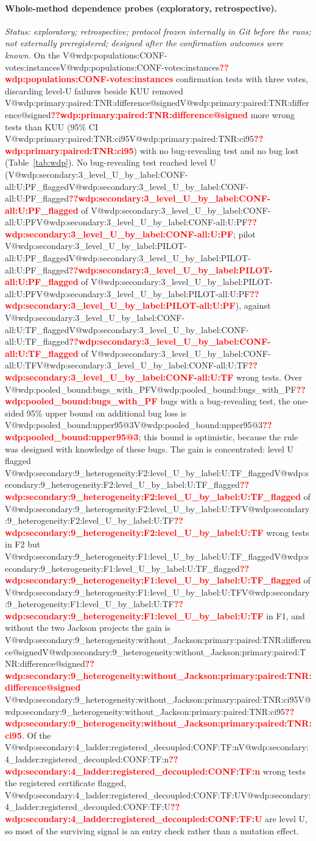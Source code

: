 \documentclass[journal]{IEEEtran}
\makeatletter
\newcommand{\V}[1]{\ifcsname V@#1\endcsname\csname V@#1\endcsname\else\textbf{\textcolor{red}{??#1}}\fi}
\makeatother
\begin{document}
\paragraph{Whole-method dependence probes (exploratory, retrospective).} \emph{Status: exploratory; retrospective; protocol frozen internally in Git before the runs; not externally preregistered; designed after the confirmation outcomes were known.} On the \V{wdp:populations:CONF-votes:instances} confirmation tests with three votes, discarding level-U failures beside KUU removed \V{wdp:primary:paired:TNR:difference@signed} more wrong tests than KUU (95\% CI \V{wdp:primary:paired:TNR:ci95}) with no bug-revealing test and no bug lost (Table~\ref{tab:wdp}). No bug-revealing test reached level U (\V{wdp:secondary:3_level_U_by_label:CONF-all:U:PF_flagged} of \V{wdp:secondary:3_level_U_by_label:CONF-all:U:PF}; pilot \V{wdp:secondary:3_level_U_by_label:PILOT-all:U:PF_flagged} of \V{wdp:secondary:3_level_U_by_label:PILOT-all:U:PF}), against \V{wdp:secondary:3_level_U_by_label:CONF-all:U:TF_flagged} of \V{wdp:secondary:3_level_U_by_label:CONF-all:U:TF} wrong tests. Over \V{wdp:pooled_bound:bugs_with_PF} bugs with a bug-revealing test, the one-sided 95\% upper bound on additional bug loss is \V{wdp:pooled_bound:upper95@3}; this bound is optimistic, because the rule was designed with knowledge of these bugs. The gain is concentrated: level U flagged \V{wdp:secondary:9_heterogeneity:F2:level_U_by_label:U:TF_flagged} of \V{wdp:secondary:9_heterogeneity:F2:level_U_by_label:U:TF} wrong tests in F2 but \V{wdp:secondary:9_heterogeneity:F1:level_U_by_label:U:TF_flagged} of \V{wdp:secondary:9_heterogeneity:F1:level_U_by_label:U:TF} in F1, and without the two Jackson projects the gain is \V{wdp:secondary:9_heterogeneity:without_Jackson:primary:paired:TNR:difference@signed} \V{wdp:secondary:9_heterogeneity:without_Jackson:primary:paired:TNR:ci95}. Of the \V{wdp:secondary:4_ladder:registered_decoupled:CONF:TF:n} wrong tests the registered certificate flagged, \V{wdp:secondary:4_ladder:registered_decoupled:CONF:TF:U} are level U, so most of the surviving signal is an entry check rather than a mutation effect.
\end{document}
